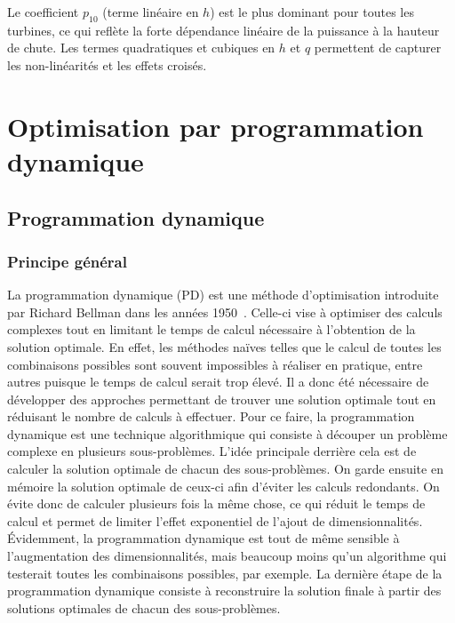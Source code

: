 \documentclass[12pt, letterpaper]{report}
\begin{document}
Le coefficient $p_{10}$ (terme linéaire en $h$) est le plus dominant pour toutes les turbines, ce qui reflète la forte dépendance linéaire de la puissance à la hauteur de chute. Les termes quadratiques et cubiques en $h$ et $q$ permettent de capturer les non-linéarités et les effets croisés.

\part{Optimisation par programmation dynamique}

\chapter{Programmation dynamique}

\section{Principe général}

La programmation dynamique (PD) est une méthode d'optimisation introduite par Richard Bellman dans les années 1950~\cite{bellman1957}.  Celle-ci vise à optimiser des calculs complexes tout en limitant le temps de calcul nécessaire à l'obtention de la solution optimale.  En effet, les méthodes naïves telles que le calcul de toutes les combinaisons possibles sont souvent impossibles à réaliser en pratique, entre autres puisque le temps de calcul serait trop élevé.  Il a donc été nécessaire de développer des approches permettant de trouver une solution optimale tout en réduisant le nombre de calculs à effectuer.  Pour ce faire, la programmation dynamique est une technique algorithmique qui consiste à découper un problème complexe en plusieurs sous-problèmes.  L'idée principale derrière cela est de calculer la solution optimale de chacun des sous-problèmes.  On garde ensuite en mémoire la solution optimale de ceux-ci afin d'éviter les calculs redondants.  On évite donc de calculer plusieurs fois la même chose, ce qui réduit le temps de calcul et permet de limiter l'effet exponentiel de l'ajout de dimensionnalités.  Évidemment, la programmation dynamique est tout de même sensible à l'augmentation des dimensionnalités, mais beaucoup moins qu'un algorithme qui testerait toutes les combinaisons possibles, par exemple.  La dernière étape de la programmation dynamique consiste à reconstruire la solution finale à partir des solutions optimales de chacun des sous-problèmes.
\end{document}

